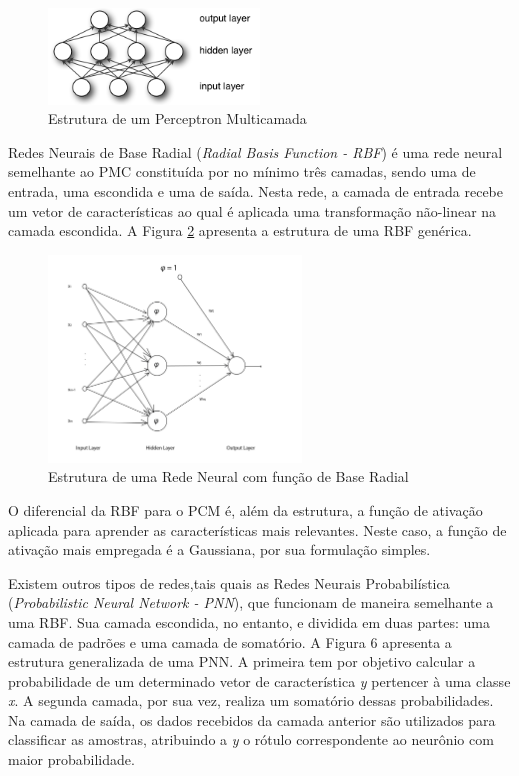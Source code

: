 \begin{figure}[ht!]
	\caption{\label{fig:pmc}Estrutura de um Perceptron Multicamada}
	\begin{center}
		\includegraphics[width=0.5\textwidth]{img/mlp.png}
	\end{center}
\end{figure}

Redes Neurais de Base Radial (\textit{Radial Basis Function - RBF}) é uma rede neural semelhante ao PMC constituída por no mínimo três camadas, sendo uma de entrada, uma escondida e uma de saída. Nesta rede, a camada de entrada recebe um vetor de características ao qual é aplicada uma transformação não-linear na camada escondida. A Figura \ref{fig:rbf2} apresenta a estrutura de uma RBF genérica. 

\begin{figure}[htb]
	\caption{\label{fig:rbf2}Estrutura de uma Rede Neural com função de Base Radial}
	\begin{center}
		\includegraphics[width=0.60\textwidth]{img/rbf2.png}
	\end{center}
\end{figure}

O diferencial da RBF para o PCM é, além da estrutura, a função de ativação aplicada para aprender as características mais relevantes. Neste caso, a função de ativação mais empregada é a Gaussiana, por sua formulação simples. 

Existem outros tipos de redes,tais quais as Redes Neurais Probabilística (\textit{Probabilistic Neural Network - PNN})\cite{specht1990probabilistic}, que funcionam de maneira semelhante a uma RBF. Sua camada escondida, no entanto, e dividida em duas partes: uma camada de padrões e uma camada de somatório. A Figura 6 apresenta a estrutura generalizada de uma PNN. A primeira tem por objetivo calcular a probabilidade de um determinado vetor de característica \textit{y} pertencer à uma classe \textit{x}. A segunda camada, por sua vez, realiza um somatório dessas probabilidades. Na camada de saída, os dados recebidos da camada anterior são utilizados para classificar as amostras, atribuindo a \textit{y} o rótulo correspondente ao neurônio com maior probabilidade.

